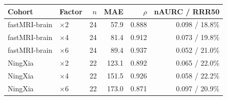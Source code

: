 \begin{tabular}{llrrrr}
\toprule
Cohort & Factor & $n$ & MAE & $\rho$ & nAURC / RRR50 \\
\midrule
fastMRI-brain & $\times$2 & 24 & 57.9 & 0.888 & 0.098 / 18.8\% \\
fastMRI-brain & $\times$4 & 24 & 81.4 & 0.912 & 0.073 / 19.8\% \\
fastMRI-brain & $\times$6 & 24 & 89.4 & 0.937 & 0.052 / 21.0\% \\
NingXia & $\times$2 & 22 & 123.1 & 0.892 & 0.065 / 22.0\% \\
NingXia & $\times$4 & 22 & 151.5 & 0.926 & 0.058 / 22.2\% \\
NingXia & $\times$6 & 22 & 173.0 & 0.871 & 0.097 / 20.9\% \\
\bottomrule
\end{tabular}
